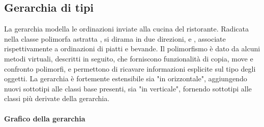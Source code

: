 \subsection{Gerarchia di tipi} %
\label{sub:gerarchia_di_tipi}
La gerarchia modella le ordinazioni inviate alla cucina del ristorante. Radicata nella classe polimorfa astratta , si dirama in due direzioni,  e , associate rispettivamente a ordinazioni di piatti e bevande. Il polimorfismo è dato da alcuni metodi virtuali, descritti in seguito, che forniscono funzionalità di copia, move e confronto polimorfi, e permettono di ricavare informazioni esplicite sul tipo degli oggetti. La gerarchia è fortemente estensibile sia "in orizzontale", aggiungendo nuovi sottotipi alle classi base presenti, sia "in verticale", fornendo sottotipi alle classi più derivate della gerarchia.
\paragraph{Grafico della gerarchia} %
\label{par:grafico_della_gerarchia}

